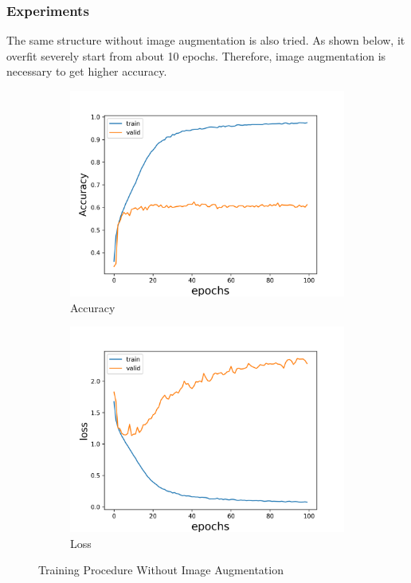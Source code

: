 \documentclass[fleqn,a4paper,12pt]{article}
\begin{document}
\subsubsection*{Experiments}

The same structure without image augmentation is also tried. As shown below, it overfit severely start from about 10 epochs. Therefore, image augmentation is necessary to get higher accuracy.

\begin{figure}[H]
\centering
\begin{subfigure}{.5\textwidth}
  \centering
  \includegraphics[width=\linewidth]{report-imgs/accuracy-without-aug.png}
  \caption{Accuracy}
  \label{fig:sub1}
\end{subfigure}%
\begin{subfigure}{.5\textwidth}
  \centering
  \includegraphics[width=\linewidth]{report-imgs/loss-without-aug.png}
  \caption{Loss}
  \label{fig:sub2}
\end{subfigure}
\caption{Training Procedure Without Image Augmentation}
\label{fig:test}
\end{figure}
\end{document}
